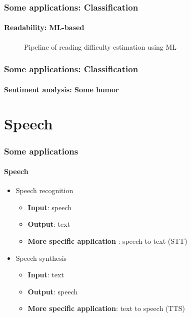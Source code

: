 \documentclass[xcolor=table]{beamer}
\begin{document}
\begin{frame}
	\frametitle{Some applications: Classification}
	\framesubtitle{Readability: ML-based}
	
	\begin{figure}
		\centering
		\caption{Pipeline of reading difficulty estimation using ML \cite{2014-collins}}
	\end{figure}
	
\end{frame}

\begin{frame}
	\frametitle{Some applications: Classification}
	\framesubtitle{Sentiment analysis: Some humor}
	
	\begin{center}
	\end{center}
	
\end{frame}

\section{Speech}

\begin{frame}
	\frametitle{Some applications}
	\framesubtitle{Speech}
	\begin{itemize}
		\item Speech recognition
		\begin{itemize}
			\item \textbf{Input}: speech
			\item \textbf{Output}: text
			\item \textbf{More specific application} : speech to text (STT)
		\end{itemize}
		\item Speech synthesis
		\begin{itemize}
			\item \textbf{Input}: text
			\item \textbf{Output}: speech
			\item \textbf{More specific application}: text to speech (TTS)
		\end{itemize}
	\end{itemize}
\end{frame}
\end{document}

